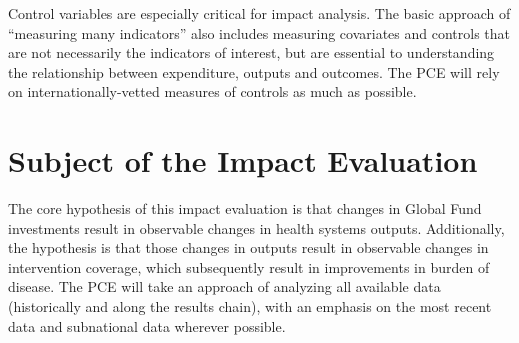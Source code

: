 \documentclass[twocolumn]{bmcart}%
\begin{document}
Control variables are especially critical for impact analysis. The basic approach of ``measuring many indicators'' also includes measuring covariates and controls that are not necessarily the indicators of interest, but are essential to understanding the relationship between expenditure, outputs and outcomes. The PCE will rely on internationally-vetted measures of controls as much as possible. \\









\section{Subject of the Impact Evaluation} \label{hypothesis}

The core hypothesis of this impact evaluation is that changes in Global Fund investments result in observable changes in health systems outputs. Additionally, the hypothesis is that those changes in outputs result in observable changes in intervention coverage, which subsequently result in improvements in burden of disease. The PCE will take an approach of analyzing all available data (historically and along the results chain), with an emphasis on the most recent data and subnational data wherever possible. \\
\end{document}
